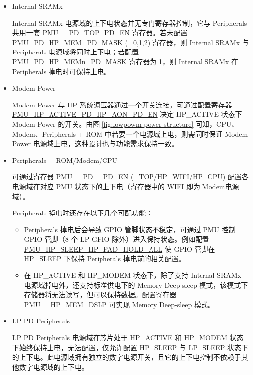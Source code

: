 \documentclass[main\_\_CN.tex]{subfiles}
\begin{document}
\begin{itemize}
\item Internal SRAMx

    Internal SRAMx 电源域的上下电状态并无专门寄存器控制，它与 Peripherals 共用一套 PMU\_\_PD\_TOP\_PD\_EN 寄存器。若未配置 \hyperref[fielddesc:PMUPDHPMEM0PDMASK]{PMU\_PD\_HP\_MEM\_PD\_MASK} (=0,1,2) 寄存器，则 Internal SRAMx 与 Peripherals 电源域将同时上下电；若配置 \hyperref[fielddesc:PMUPDHPMEM0PDMASK]{PMU\_PD\_HP\_MEMn\_PD\_MASK} 寄存器为 1，则 Internal SRAMx 在 Peripherals 掉电时可保持上电。

\item Modem Power

    Modem Power 与 HP 系统调压器通过一个开关连接，可通过配置寄存器 \hyperref[fielddesc:PMUHPACTIVEPDHPAONPDEN]{PMU\_HP\_ACTIVE\_PD\_HP\_AON\_PD\_EN} 决定 HP\_ACTIVE 状态下 Modem Power 的开关。由图 \ref{fig:lowpowm-power-structure} 可知，CPU、Modem、Peripherals + ROM 中若要一个电源域上电，则需同时保证 Modem Power 电源域上电，这种设计也与功能需求保持一致。

\item Peripherals + ROM/Modem/CPU

    可通过寄存器 PMU\_\_PD\_\_PD\_EN (=TOP/HP\_WIFI/HP\_CPU) 配置各电源域在对应 PMU 状态下的上下电（寄存器中的 WIFI 即为 Modem电源域）。

    Peripherals 掉电时还存在以下几个可配功能：
        \begin{itemize}
        \item Peripherals 掉电后会导致 GPIO 管脚状态不稳定，可通过 PMU 控制 GPIO 管脚（8 个 LP GPIO 除外）进入保持状态。例如配置 \hyperref[fielddesc:PMUHPSLEEPHPPADHOLDALL]{PMU\_HP\_SLEEP\_HP\_PAD\_HOLD\_ALL} 使 GPIO 管脚在 HP\_SLEEP 下保持 Peripherals 掉电前的相关配置。

        \item 在 HP\_ACTIVE 和 HP\_MODEM 状态下，除了支持 Internal SRAMx 电源域掉电外，还支持标准供电下的 Memory Deep-sleep 模式，该模式下存储器将无法读写，但可以保持数据。配置寄存器 PMU\_\_HP\_MEM\_DSLP 可实现 Memory Deep-sleep 模式。
        \end{itemize}

\item LP PD Peripherals

    LP PD Peripherals 电源域在芯片处于 HP\_ACTIVE 和 HP\_MODEM 状态下始终保持上电，无法配置，仅允许配置 HP\_SLEEP 与 LP\_SLEEP 状态下的上下电。此电源域拥有独立的数字电源开关，且它的上下电控制不依赖于其他数字电源域的上下电。
\end{itemize}
\end{document}
